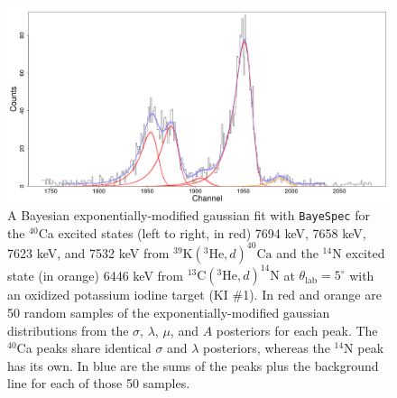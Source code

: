 \begin{figure}
\centering
\includegraphics[width=6.5in]{Chapter-6/figs/EMG_Multiplet.png}
\caption{\label{fig:EMG_Multiplet}A Bayesian exponentially-modified gaussian fit with \texttt{BayeSpec} for the $^{40}$Ca excited states (left to right, in red) 7694 keV, 7658 keV, 7623 keV, and 7532 keV from $^{39}\mathrm{K}(^{3}\mathrm{He},d)^{40}\mathrm{Ca}$ and the $^{14}$N excited state (in orange) 6446 keV from $^{13}\mathrm{C}(^{3}\mathrm{He},d)^{14}\mathrm{N}$ at $\theta_{\mathrm{lab}} = 5^{\circ}$ with an oxidized potassium iodine target (KI $\#$1). In red and orange are 50 random samples of the exponentially-modified gaussian distributions from the $\sigma$, $\lambda$, $\mu$, and $A$ posteriors for each peak. The $^{40}$Ca peaks share identical $\sigma$ and $\lambda$ posteriors, whereas the $^{14}$N peak has its own. In blue are the sums of the peaks plus the background line for each of those 50 samples.}
\end{figure}

\newpage




